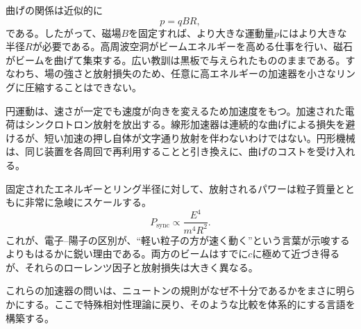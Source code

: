 曲げの関係は近似的に
\begin{equation}
p=qBR,
\end{equation}
である。したがって、磁場\(B\)を固定すれば、より大きな運動量\(p\)にはより大きな半径\(R\)が必要である。高周波空洞がビームエネルギーを高める仕事を行い、磁石がビームを曲げて集束する。広い教訓は黒板で与えられたもののままである。すなわち、場の強さと放射損失のため、任意に高エネルギーの加速器を小さなリングに圧縮することはできない。

円運動は、速さが一定でも速度が向きを変えるため加速度をもつ。加速された電荷はシンクロトロン放射を放出する。線形加速器は連続的な曲げによる損失を避けるが、短い加速の押し自体が文字通り放射を伴わないわけではない。円形機械は、同じ装置を各周回で再利用することと引き換えに、曲げのコストを受け入れる。

\begin{classroomqa}
\end{classroomqa}

固定されたエネルギーとリング半径に対して、放射されるパワーは粒子質量とともに非常に急峻にスケールする。
\begin{equation}
P_{\mathrm{sync}}\propto \frac{E^4}{m^4R^2}.
\end{equation}
これが、電子--陽子の区別が、``軽い粒子の方が速く動く''という言葉が示唆するよりもはるかに鋭い理由である。両方のビームはすでに\(c\)に極めて近づき得るが、それらのローレンツ因子と放射損失は大きく異なる。

\begin{classroomqa}
\end{classroomqa}

これらの加速器の問いは、ニュートンの規則がなぜ不十分であるかをまさに明らかにする。ここで特殊相対性理論に戻り、そのような比較を体系的にする言語を構築する。

